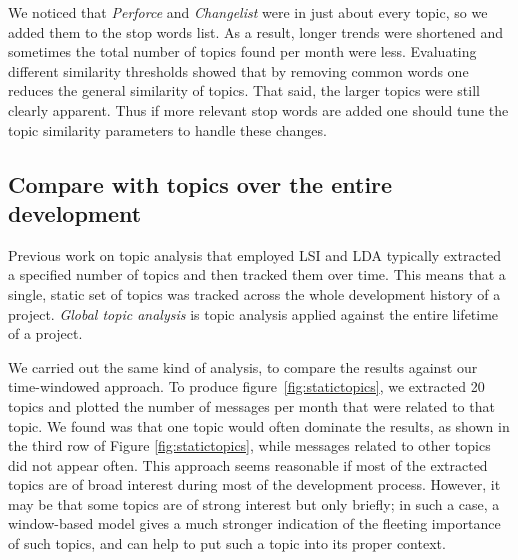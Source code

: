 \documentclass[times, 10pt,twocolumn]{article}
\newcommand{\shrinkit}{\vspace*{-.3em}}
\begin{document}
We noticed that \emph{Perforce} and \emph{Changelist} were in just
about every topic, so we added them to the stop words list. As a
result, longer trends were shortened and sometimes the total
number of topics found per month were less.  Evaluating different
similarity thresholds showed that by removing common words one reduces
the general similarity of topics. That said, the larger topics were still
clearly apparent. Thus if more relevant stop words are added one
should tune the topic similarity parameters to handle these changes.





\shrinkit
\subsection{Compare with topics over the entire development}
\shrinkit





Previous work on topic analysis that employed LSI and LDA typically
extracted a specified number of topics and then tracked them over
time. This means that a single, static set of topics was tracked
across the whole development history of a project. \emph{Global topic
  analysis} is topic analysis applied against the entire lifetime of a
project.

We carried out the same kind of analysis,          to compare the
results against our time-windowed approach.  To produce
figure~\ref{fig:statictopics}, we extracted 20 topics and plotted the
number of messages per month that were related to that topic. We found
was that one topic would often dominate the results, as shown in the
third row of Figure \ref{fig:statictopics}, while messages related to
other topics did not appear often.
This approach seems reasonable if most of the extracted topics are of
broad interest during most of the development process.  However, it
may be that some topics are of strong interest but only briefly; in
such a case, a window-based model gives a much stronger indication of
the fleeting importance of such topics, and can help to put such a
topic into its proper context.
\end{document}
